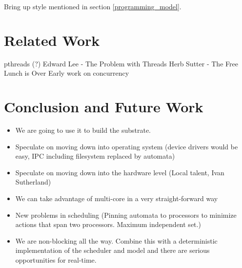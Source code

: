\documentclass[letterpaper]{article}
\begin{document}
Bring up style mentioned in section \ref{programming_model}.

\section{Related Work}

pthreads (?)
Edward Lee - The Problem with Threads
Herb Sutter - The Free Lunch is Over
Early work on concurrency

\section{Conclusion and Future Work}

\begin{itemize}
  \item We are going to use it to build the substrate.
  \item Speculate on moving down into operating system (device drivers would be easy, IPC including filesystem replaced by automata)
  \item Speculate on moving down into the hardware level (Local talent, Ivan Sutherland)
  \item We can take advantage of multi-core in a very straight-forward way
  \item New problems in scheduling (Pinning automata to processors to minimize actions that span two processors.  Maximum independent set.)
  \item We are non-blocking all the way.  Combine this with a deterministic implementation of the scheduler and model and there are serious opportunities for real-time.
\end{itemize}
\end{document}
